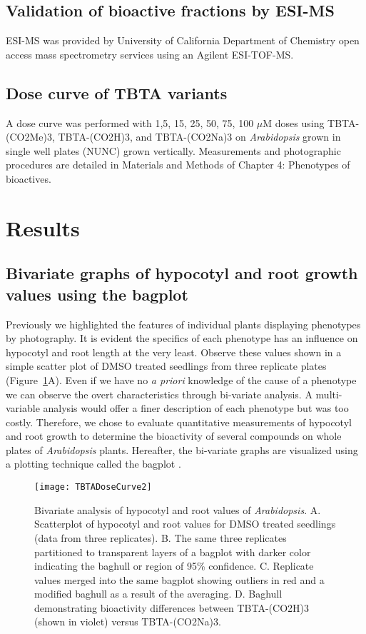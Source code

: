 \subsection{Validation of bioactive fractions by ESI-MS}

ESI-MS was provided by University of California Department of Chemistry open access mass spectrometry services using an Agilent ESI-TOF-MS.

\subsection{Dose curve of TBTA variants}

A dose curve was performed with 1,5, 15, 25, 50, 75, 100 $\mu$M doses using TBTA-(CO2Me)3, TBTA-(CO2H)3, and TBTA-(CO2Na)3 on {\it Arabidopsis} grown in single well plates (NUNC) grown vertically. Measurements and photographic procedures are detailed in Materials and Methods of Chapter 4: Phenotypes of bioactives.


\section{Results}

\subsection{Bivariate graphs of hypocotyl and root growth values using the bagplot}

Previously we highlighted the features of individual plants displaying phenotypes by photography. It is evident the specifics of each phenotype has an influence on hypocotyl and root length at the very least. Observe these values shown in a simple scatter plot of DMSO treated seedlings from three replicate plates (Figure~\ref{fig:TBTADoseCurve}A). Even if we have no {\it a priori} knowledge of the cause of a phenotype we can observe the overt characteristics through bi-variate analysis. A multi-variable analysis would offer a finer description of each phenotype but was too costly. Therefore, we chose to evaluate quantitative measurements of hypocotyl and root growth to determine the bioactivity of several compounds on whole plates of {\it Arabidopsis} plants. Hereafter, the bi-variate graphs are visualized using a plotting technique called the bagplot \cite{rousseeuw1999bagplot}.

\begin{figure}
\texttt{[image: TBTADoseCurve2]}
\caption{Bivariate analysis of hypocotyl and root values of {\it Arabidopsis}. A. Scatterplot of hypocotyl and root values for DMSO treated seedlings (data from three replicates). B. The same three replicates partitioned to transparent layers of a bagplot with darker color indicating the baghull or region of 95{\%} confidence. C. Replicate values merged into the same bagplot showing outliers in red and a modified baghull as a result of the averaging. D. Baghull demonstrating bioactivity differences between TBTA-(CO2H)3 (shown in violet) versus TBTA-(CO2Na)3.}
\label{fig:TBTADoseCurve}
\end{figure}

